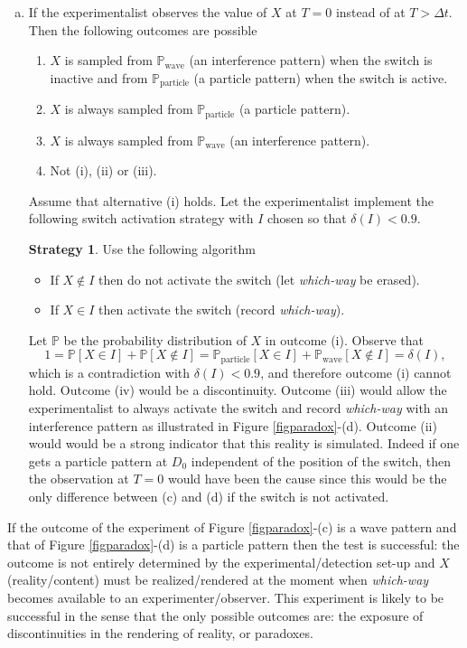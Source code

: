 \documentclass[11pt]{article}
\renewcommand{\P}{\mathbb{P}}
\newcommand{\pa}{\text{particle}}
\newcommand{\wa}{\text{wave}}
\theoremstyle{definition}
\newtheorem{Strategy}{Strategy}
\begin{document}
\begin{enumerate}[(a)]
\item If the experimentalist observes the value of $X$ at $T=0$ instead of at $T>\Delta t$. Then the following outcomes are possible
\begin{enumerate}[i]
\item  $X$ is sampled from $\P_\wa$ (an interference pattern) when the switch is inactive and from $\P_\pa$  (a particle pattern) when the switch is active.
\item $X$ is always sampled from $\P_\pa$ (a particle pattern).
\item $X$ is always sampled from $\P_\wa$ (an interference pattern).
\item Not (i), (ii) or (iii).
\end{enumerate}
Assume that alternative (i) holds.  Let the experimentalist implement the following switch activation strategy with $I$ chosen so that $\delta(I)<0.9$.
\begin{Strategy}\label{str1}
Use the following algorithm
\begin{itemize}
\item If $X\not \in I$ then do not activate the switch (let \emph{which-way} be erased).
\item If $X \in I$ then  activate the switch (record \emph{which-way}).
\end{itemize}
\end{Strategy}
Let $\P$ be the probability distribution of $X$ in outcome (i). Observe that
\begin{equation}\label{eqkhjhkjkjhui}
1=\P[X\in I]+\P[X\not \in I]=\P_\pa[X\in I]+ \P_\wa[X\not \in I]=\delta(I),
\end{equation}
which is a contradiction with $\delta(I)<0.9$, and therefore outcome (i) cannot hold. Outcome
(iv) would be a discontinuity. Outcome (iii) would allow the experimentalist to always activate the switch and record \emph{which-way} with an interference pattern as illustrated in Figure \ref{figparadox}-(d). Outcome (ii) would would be a strong indicator that this reality is simulated. Indeed if  one gets a particle pattern at
 $D_0$ independent of the position of the switch, then the observation at $T=0$ would have been the cause since this  would be the only difference between (c) and (d) if the switch is not activated.
\end{enumerate}
If the outcome of the experiment of Figure \ref{figparadox}-(c) is a wave pattern and that of  Figure \ref{figparadox}-(d) is a  particle pattern then the test is successful: the outcome is not entirely determined by the experimental/detection set-up and $X$  (reality/content) must be realized/rendered at the moment when \emph{which-way} becomes available to an experimenter/observer.
This experiment is likely to be successful in the sense that the  only  possible outcomes are: the exposure of  discontinuities in the rendering of reality, or paradoxes.
\end{document}

